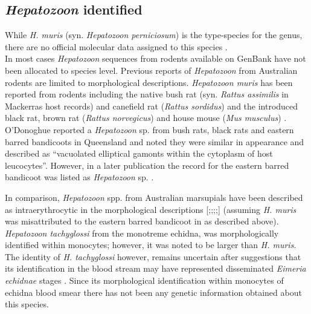 \documentclass[a4paper, nobind]{templates/ociamthesis}
\begin{document}
\hypertarget{hepatozoon-identified}{%
\subsection{\texorpdfstring{\emph{Hepatozoon} identified}{Hepatozoon identified}}\label{hepatozoon-identified}}

While \emph{H. muris} (syn. \emph{Hepatozoon perniciosum}) is the type-species for the genus, there are no official molecular data assigned to this species \autocite{hrazdilovaQuestTypeSpecies2021}.\\
In most cases \emph{Hepatozoon} sequences from rodents available on GenBank have not been allocated to species level.
Previous reports of \emph{Hepatozoon} from Australian rodents are limited to morphological descriptions.
\emph{Hepatozoon muris} has been reported from rodents including the native bush rat (syn. \emph{Rattus assimilis} in Mackerras \autocite*{mackerrasCatalogueAustralianMammals1958a,mackerrasHaematozoaAustralianMammals1959} host records) and canefield rat (\emph{Rattus sordidus}) and the introduced black rat, brown rat (\emph{Rattus norvegicus}) and house mouse (\emph{Mus musculus}) \autocite{mackerrasCatalogueAustralianMammals1958a,mackerrasHaematozoaAustralianMammals1959,odonoghueCatalogueProtozoanParasites2000}.
O'Donoghue \autocite*{odonoghueProtozoanParasitesWildlife1997} reported a \emph{Hepatozoon} sp. from bush rats, black rats and eastern barred bandicoots in Queensland and noted they were similar in appearance and described as ``vacuolated elliptical gamonts within the cytoplasm of host leucocytes''.
However, in a later publication the record for the eastern barred bandicoot was listed as \emph{Hepatozoon} sp. \autocite{odonoghueCatalogueProtozoanParasites2000}.

In comparison, \emph{Hepatozoon} spp. from Australian marsupials have been described as intraerythrocytic in the morphological descriptions {[}\textcite{mackerrasHaematozoaAustralianMammals1959};\textcite{bettiolFirstRecordMember1996};\textcite{wicksMorphologicalMolecularCharacteristics2006};\textcite{barbosaPrevalenceGeneticDiversity2017a};{]} (assuming \emph{H. muris} was misattributed to the eastern barred bandicoot in \textcite{odonoghueProtozoanParasitesWildlife1997} as described above).
\emph{Hepatozoon tachyglossi} from the monotreme echidna, was morphologically identified within monocytes; however, it was noted to be larger than \emph{H. muris}.
The identity of \emph{H. tachyglossi} however, remains uncertain after suggestions that its identification in the blood stream may have represented disseminated \emph{Eimeria echidnae} stages \autocite{slapetaDeepsequencingResolveComplex2017}.
Since its morphological identification within monocytes of echidna blood smear \autocite{clarkHepatozoonTachyglossiSp2005,ploegHepatozoonTachyglossiShortbeaked2008} there has not been any genetic information obtained about this species.
\end{document}
